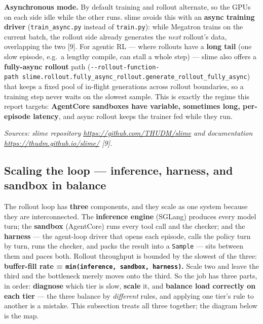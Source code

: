 \documentclass[
  paper=a4,
  ,captions=tableheading
]{scrartcl}
\begin{document}
\textbf{Asynchronous mode.} By default training and rollout alternate,
so the GPUs on each side idle while the other runs. slime avoids this
with an \textbf{async training driver} (\texttt{train\_async.py} instead
of \texttt{train.py}): while Megatron trains on the current batch, the
rollout side already generates the \emph{next} rollout's data,
overlapping the two {[}9{]}. For agentic RL --- where rollouts have a
\textbf{long tail} (one slow episode, e.g.~a lengthy compile, can stall
a whole step) --- slime also offers a \textbf{fully-async rollout} path
(\texttt{-\/-rollout-function-path\ slime.rollout.fully\_async\_rollout.generate\_rollout\_fully\_async})
that keeps a fixed pool of in-flight generations across rollout
boundaries, so a training step never waits on the slowest sample. This
is exactly the regime this report targets: \textbf{AgentCore sandboxes
have variable, sometimes long, per-episode latency}, and async rollout
keeps the trainer fed while they run.

\emph{Sources: slime repository \url{https://github.com/THUDM/slime} and
documentation \url{https://thudm.github.io/slime/} {[}9{]}.}

\hypertarget{scaling-the-loop-inference-harness-and-sandbox-in-balance}{%
\subsection{Scaling the loop --- inference, harness, and sandbox in
balance}\label{scaling-the-loop-inference-harness-and-sandbox-in-balance}}

The rollout loop has \textbf{three} components, and they scale as one
system because they are interconnected. The \textbf{inference engine}
(SGLang) produces every model turn; the \textbf{sandbox} (AgentCore)
runs every tool call and the checker; and the \textbf{harness} --- the
agent-loop driver that opens each episode, calls the policy turn by
turn, runs the checker, and packs the result into a \texttt{Sample} ---
sits between them and paces both. Rollout throughput is bounded by the
slowest of the three: \textbf{buffer-fill rate =
\texttt{min(inference,\ sandbox,\ harness)}.} Scale two and leave the
third and the bottleneck merely moves onto the third. So the job has
three parts, in order: \textbf{diagnose} which tier is slow,
\textbf{scale} it, and \textbf{balance load correctly on each tier} ---
the three balance by \emph{different} rules, and applying one tier's
rule to another is a mistake. This subsection treats all three together;
the diagram below is the map.
\end{document}
